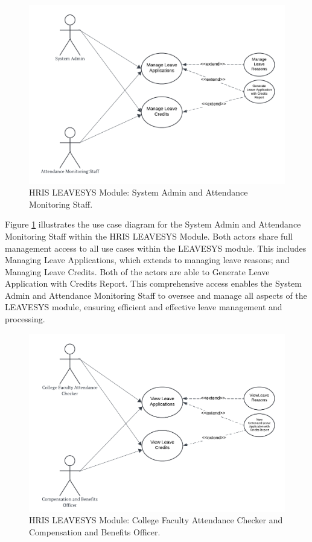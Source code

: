     \begin{figure}[H]
        \centering
        \includegraphics[width=0.9\linewidth]{figures/images/use-case-leave-1.png}
        \caption{HRIS LEAVESYS Module: System Admin and Attendance Monitoring Staff.}
        \label{fig:use-case-leave-1}
    \end{figure}

    Figure \ref{fig:use-case-leave-1} illustrates the use case diagram for the System Admin and Attendance Monitoring Staff within the HRIS LEAVESYS Module. Both actors share full management access to all use cases within the LEAVESYS module. This includes Managing Leave Applications, which extends to managing leave reasons; and Managing Leave Credits. Both of the actors are able to Generate Leave Application with Credits Report. This comprehensive access enables the System Admin and Attendance Monitoring Staff to oversee and manage all aspects of the LEAVESYS module, ensuring efficient and effective leave management and processing.

    \begin{figure}[H]
        \centering
        \includegraphics[width=0.9\linewidth]{figures/images/use-case-leave-2.png}
        \caption{HRIS LEAVESYS Module: College Faculty Attendance Checker and Compensation and Benefits Officer.}
        \label{fig:use-case-leave-2}
    \end{figure}

